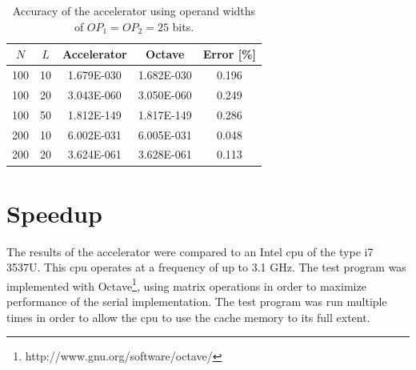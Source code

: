 \documentclass[mscthesis]{usiinfthesis}
\begin{document}
\begin{table}
    \footnotesize
    \begin{center}
    \begin{tabular}{|c|c|c|c|c|}
        \hline
        $N$ & $L$ & Accelerator & Octave & Error [\%] \\
        \hline
        \hline
        100 & 10 & 1.679E-030 & 1.682E-030 & 0.196 \\
        100 & 20 & 3.043E-060 & 3.050E-060 & 0.249 \\
        100 & 50 & 1.812E-149 & 1.817E-149 & 0.286 \\
        200 & 10 & 6.002E-031 & 6.005E-031 & 0.048 \\
        200 & 20 & 3.624E-061 & 3.628E-061 & 0.113 \\
        \hline
    \end{tabular}
    \end{center}
    \caption{Accuracy of the accelerator using operand widths of
        $OP_1 = OP_2 = 25$ bits.}
    \label{tab:res_mid}
\end{table}

\section{Speedup}

The results of the accelerator were compared to an Intel \gls{cpu} of the type
i7 3537U. This \gls{cpu} operates at a frequency of up to 3.1 GHz. The test
program was implemented with
Octave\footnote{http://www.gnu.org/software/octave/}, using matrix operations
in order to maximize performance of the serial implementation. The test program
was run multiple times in order to allow the \gls{cpu} to use the cache memory
to its full extent.
\end{document}
